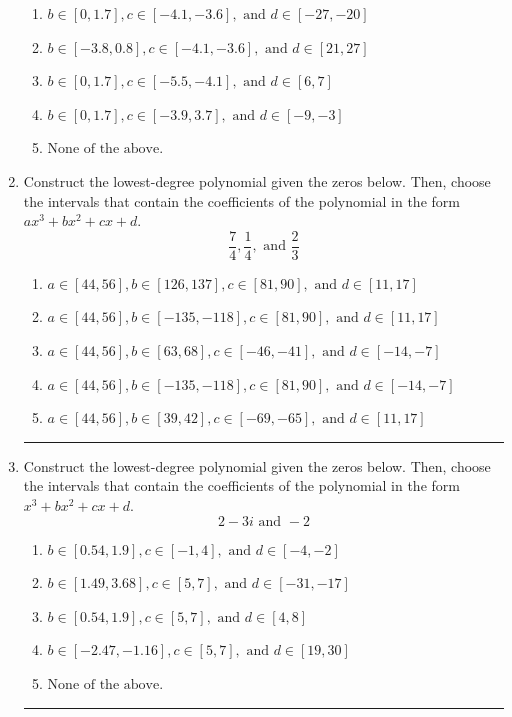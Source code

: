 \documentclass[14pt]{extbook}
\newcommand{\litem}[1]{\item#1\hspace*{-1cm}\rule{\textwidth}{0.4pt}}
\begin{document}
\begin{enumerate}
{\begin{enumerate}[label=\Alph*.]
\item \( b \in [0, 1.7], c \in [-4.1, -3.6], \text{ and } d \in [-27, -20] \)
\item \( b \in [-3.8, 0.8], c \in [-4.1, -3.6], \text{ and } d \in [21, 27] \)
\item \( b \in [0, 1.7], c \in [-5.5, -4.1], \text{ and } d \in [6, 7] \)
\item \( b \in [0, 1.7], c \in [-3.9, 3.7], \text{ and } d \in [-9, -3] \)
\item \( \text{None of the above.} \)

\end{enumerate} }
\litem{
Construct the lowest-degree polynomial given the zeros below. Then, choose the intervals that contain the coefficients of the polynomial in the form $ax^3+bx^2+cx+d$.\[ \frac{7}{4}, \frac{1}{4}, \text{ and } \frac{2}{3} \]\begin{enumerate}[label=\Alph*.]
\item \( a \in [44, 56], b \in [126, 137], c \in [81, 90], \text{ and } d \in [11, 17] \)
\item \( a \in [44, 56], b \in [-135, -118], c \in [81, 90], \text{ and } d \in [11, 17] \)
\item \( a \in [44, 56], b \in [63, 68], c \in [-46, -41], \text{ and } d \in [-14, -7] \)
\item \( a \in [44, 56], b \in [-135, -118], c \in [81, 90], \text{ and } d \in [-14, -7] \)
\item \( a \in [44, 56], b \in [39, 42], c \in [-69, -65], \text{ and } d \in [11, 17] \)

\end{enumerate} }
\litem{
Construct the lowest-degree polynomial given the zeros below. Then, choose the intervals that contain the coefficients of the polynomial in the form $x^3+bx^2+cx+d$.\[ 2 - 3 i \text{ and } -2 \]\begin{enumerate}[label=\Alph*.]
\item \( b \in [0.54, 1.9], c \in [-1, 4], \text{ and } d \in [-4, -2] \)
\item \( b \in [1.49, 3.68], c \in [5, 7], \text{ and } d \in [-31, -17] \)
\item \( b \in [0.54, 1.9], c \in [5, 7], \text{ and } d \in [4, 8] \)
\item \( b \in [-2.47, -1.16], c \in [5, 7], \text{ and } d \in [19, 30] \)
\item \( \text{None of the above.} \)


\end{enumerate}}
\end{enumerate}
\end{document}
